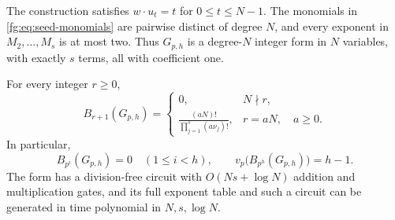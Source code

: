 \begin{proposition}
\label{fg:prop:coefficient-seed}
The construction satisfies $w\cdot u_t=t$ for $0\le t\le N-1$.
The monomials in \eqref{fg:eq:seed-monomials} are pairwise distinct
of degree $N$, and every exponent in $M_2,\ldots,M_s$ is at most two.
Thus $G_{p,h}$ is a degree-$N$ integer form in $N$ variables, with
exactly $s$ terms, all with coefficient one.

For every integer $r\ge0$,
\begin{equation}\label{fg:eq:seed-period}
 B_{r+1}(G_{p,h})=
 \begin{cases}
 0,&N\nmid r,\\[1mm]
 \displaystyle\frac{(aN)!}{\prod_{j=1}^s(a\nu_j)!},
       &r=aN,\quad a\ge0.
 \end{cases}
\end{equation}
In particular,
\begin{equation}\label{fg:eq:seed-height-data}
 B_{p^i}(G_{p,h})=0\quad(1\le i<h),\qquad
 v_p\bigl(B_{p^h}(G_{p,h})\bigr)=h-1.
\end{equation}
The form has a division-free circuit with
$O(Ns+\log N)$ addition and multiplication gates, and its full exponent
table and such a circuit can be generated in time polynomial in
$N,s,\log N$.
\end{proposition}

